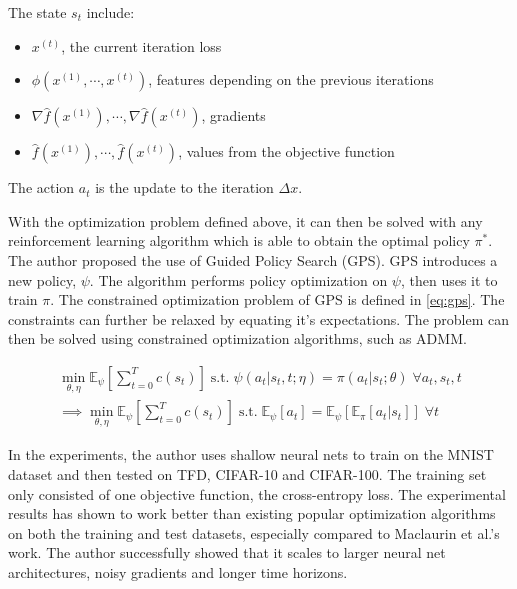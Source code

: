 \documentclass{article}
\begin{document}
The state $s_t$ include:
\begin{itemize}
    \item $x^{(t)}$, the current iteration loss
    \item $\phi(x^{(1)}, \cdots, x^{(t)})$, features depending on the previous iterations
    \item $\nabla \hat{f}(x^{(1)}), \cdots, \nabla \hat{f}(x^{(t)})$, gradients
    \item $\hat{f}(x^{(1)}), \cdots, \hat{f}(x^{(t)})$, values from the objective function
\end{itemize}

The action $a_t$ is the update to the iteration $\Delta x$.

With the optimization problem defined above, it can then be solved with any reinforcement learning algorithm which is able to obtain the optimal policy $\pi^*$. The author proposed the use of Guided Policy Search (GPS). GPS introduces a new policy, $\psi$. The algorithm performs policy optimization on $\psi$, then uses it to train $\pi$. The constrained optimization problem of GPS is defined in \cref{eq:gps}. The constraints can further be relaxed by equating it's expectations. The problem can then be solved using constrained optimization algorithms, such as ADMM.

\begin{equation}
    \begin{split}
        \min_{\theta, \eta} \mathbb{E}_{\psi} [\sum_{t=0}^{T} c(s_t)] \; \text{s.t.} \; \psi (a_t | s_t, t; \eta) = \pi (a_t | s_t; \theta) \; \forall a_t, s_t, t\\
        \implies \min_{\theta, \eta} \mathbb{E}_{\psi} [\sum_{t=0}^{T} c(s_t)] \; \text{s.t.} \; \mathbb{E}_{\psi} [a_t] =  \mathbb{E}_{\psi} [ \mathbb{E}_{\pi} [a_t | s_t ]]\; \forall t
    \end{split}
    \label{eq:gps}
\end{equation}

In the experiments, the author uses shallow neural nets to train on the MNIST dataset and then tested on TFD, CIFAR-10 and CIFAR-100. The training set only consisted of one objective function, the cross-entropy loss. The experimental results has shown to work better than existing popular optimization algorithms on both the training and test datasets, especially compared to Maclaurin et al.'s work. The author successfully showed that it scales to larger neural net architectures, noisy gradients and longer time horizons.
\end{document}

